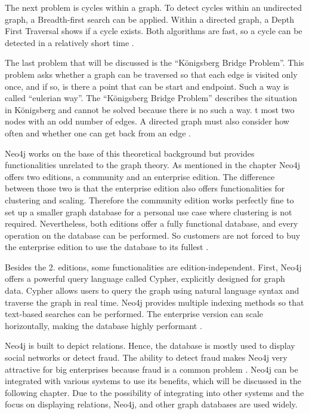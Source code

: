 The next problem is cycles within a graph. To detect cycles within an undirected graph, a Breadth-first search can be applied. Within a directed graph, a Depth First Traversal shows if a cycle exists. Both algorithms are fast, so a cycle can be detected in a relatively short time \parencite{graphCircle, cycle_directed}.

The last problem that will be discussed is the \enquote{Königsberg Bridge Problem}. This problem asks whether a graph can be traversed so that each edge is visited only once, and if so, is there a point that can be start and endpoint. Such a way is called \enquote{eulerian way}. The
\enquote{Königsberg Bridge Problem} describes the situation in Königsberg and cannot be solved because there is no such a way. t most two nodes with an odd number of edges. A directed graph must also consider how often and whether one can get back from an edge \parencite{koenigsberger}.

Neo4j works on the base of this theoretical background but provides functionalities unrelated to the graph theory. As mentioned in the chapter  Neo4j offers two editions, a community and an enterprise edition. The difference between those two is that the enterprise edition also offers functionalities for clustering and scaling. Therefore the community edition works perfectly fine to set up a smaller
graph database for a personal use case where clustering is not required. Nevertheless, both editions offer a fully functional database, and every operation on the database can be performed. So customers are not forced to buy the enterprise edition to use the database to its fullest \parencite{Neo4jfeatures}.

Besides the 2. editions, some functionalities are edition-independent. First, Neo4j offers a powerful query language called Cypher, explicitly designed for graph data. Cypher allows users to query the graph using natural language syntax and traverse the graph in real time. Neo4j provides multiple indexing methods so that text-based searches can be performed.
The enterprise version can scale horizontally, making the database highly performant \parencite{Neo4jfeatures}.

Neo4j is built to depict relations. Hence, the database is mostly used to display social networks or detect fraud. The ability to detect fraud makes Neo4j very attractive for big enterprises because fraud is a common problem \parencite{Neo4jfeatures}. Neo4j can be integrated with various systems to use its benefits, which will be discussed in the following chapter. Due to the possibility of integrating into other systems and the focus on displaying relations, Neo4j, and other graph databases 
are used widely.

